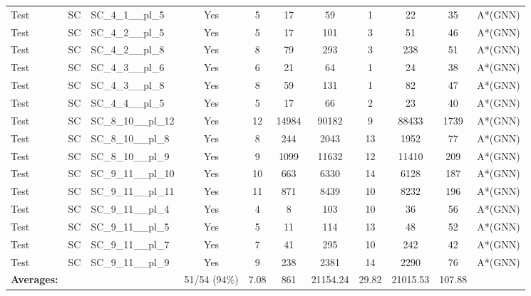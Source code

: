 \documentclass{article}
\begin{document}
\begin{tabular}{lllcccccccc}
Test & SC & SC\_4\_1\_\_pl\_5 & Yes & 5 & 17 & 59 & 1 & 22 & 35 & A*(GNN) \\
Test & SC & SC\_4\_2\_\_pl\_5 & Yes & 5 & 17 & 101 & 3 & 51 & 46 & A*(GNN) \\
Test & SC & SC\_4\_2\_\_pl\_8 & Yes & 8 & 79 & 293 & 3 & 238 & 51 & A*(GNN) \\
Test & SC & SC\_4\_3\_\_pl\_6 & Yes & 6 & 21 & 64 & 1 & 24 & 38 & A*(GNN) \\
Test & SC & SC\_4\_3\_\_pl\_8 & Yes & 8 & 59 & 131 & 1 & 82 & 47 & A*(GNN) \\
Test & SC & SC\_4\_4\_\_pl\_5 & Yes & 5 & 17 & 66 & 2 & 23 & 40 & A*(GNN) \\
Test & SC & SC\_8\_10\_\_pl\_12 & Yes & 12 & 14984 & 90182 & 9 & 88433 & 1739 & A*(GNN) \\
Test & SC & SC\_8\_10\_\_pl\_8 & Yes & 8 & 244 & 2043 & 13 & 1952 & 77 & A*(GNN) \\
Test & SC & SC\_8\_10\_\_pl\_9 & Yes & 9 & 1099 & 11632 & 12 & 11410 & 209 & A*(GNN) \\
Test & SC & SC\_9\_11\_\_pl\_10 & Yes & 10 & 663 & 6330 & 14 & 6128 & 187 & A*(GNN) \\
Test & SC & SC\_9\_11\_\_pl\_11 & Yes & 11 & 871 & 8439 & 10 & 8232 & 196 & A*(GNN) \\
Test & SC & SC\_9\_11\_\_pl\_4 & Yes & 4 & 8 & 103 & 10 & 36 & 56 & A*(GNN) \\
Test & SC & SC\_9\_11\_\_pl\_5 & Yes & 5 & 11 & 114 & 13 & 48 & 52 & A*(GNN) \\
Test & SC & SC\_9\_11\_\_pl\_7 & Yes & 7 & 41 & 295 & 10 & 242 & 42 & A*(GNN) \\
Test & SC & SC\_9\_11\_\_pl\_9 & Yes & 9 & 238 & 2381 & 14 & 2290 & 76 & A*(GNN) \\
\textbf{Averages:} & & & 51/54 (94\%) & 7.08 & 861 & 21154.24 & 29.82 & 21015.53 & 107.88 & \\
\bottomrule
\end{tabular}
\newpage
\end{document}
